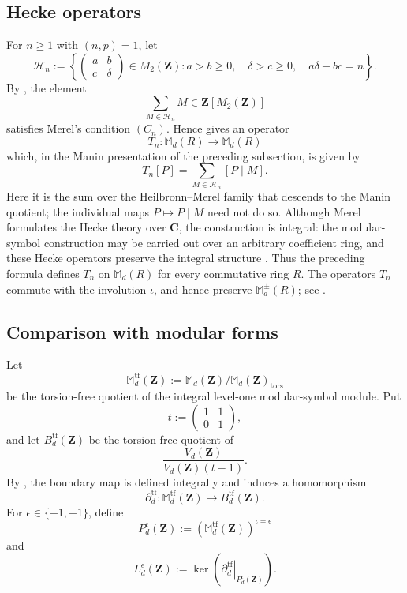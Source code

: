 \documentclass[11pt]{article}
\newcommand{\Z}{\mathbf Z}
\newcommand{\C}{\mathbf C}
\theoremstyle{plain}
\theoremstyle{definition}
\theoremstyle{remark}
\numberwithin{equation}{section}
\begin{document}
\subsection{Hecke operators} For \(n\geq1\) with \((n,p)=1\), let \[ \mathcal H_n := \left\{ \begin{pmatrix} a&b\\ c&\delta \end{pmatrix} \in M_2(\Z) : a>b\geq0,\quad \delta>c\geq0,\quad a\delta-bc=n \right\}. \] By \cite[\S3.3, Proposition~20, pp.~29--30]{Merel1994}, the element \[ \sum_{M\in\mathcal H_n}M \in\Z[M_2(\Z)] \] satisfies Merel's condition \((C_n)\). Hence \cite[\S2.1, Theorem~4, pp.~16--17]{Merel1994} gives an operator \[ T_n:\mathbb M_d(R)\longrightarrow\mathbb M_d(R) \] which, in the Manin presentation of the preceding subsection, is given by \[ T_n[P] = \sum_{M\in\mathcal H_n}[P\mid M]. \] Here it is the sum over the Heilbronn--Merel family that descends to the Manin quotient; the individual maps \(P\mapsto P\mid M\) need not do so. Although Merel formulates the Hecke theory over \(\C\), the construction is integral: the modular-symbol construction may be carried out over an arbitrary coefficient ring, and these Hecke operators preserve the integral structure \cite[\S1.1, p.~4 and \S2.1, Remark~1, p.~18]{Merel1994}. Thus the preceding formula defines \(T_n\) on \(\mathbb M_d(R)\) for every commutative ring \(R\). The operators \(T_n\) commute with the involution \(\iota\), and hence preserve \(\mathbb M_d^{\pm}(R)\); see \cite[\S2.1, Remark~2, p.~18]{Merel1994}.

\subsection{Comparison with modular forms} \label{sec:target-lattice} Let \[ \mathbb M_d^{\mathrm{tf}}(\Z) := \mathbb M_d(\Z)/\mathbb M_d(\Z)_{\mathrm{tors}} \] be the torsion-free quotient of the integral level-one modular-symbol module. Put \[ t:= \begin{pmatrix} 1&1\\ 0&1 \end{pmatrix}, \] and let \(B_d^{\mathrm{tf}}(\Z)\) be the torsion-free quotient of \[ \frac{V_d(\Z)}{V_d(\Z)(t-1)}. \] By \cite[Theorem~3.5(2)--(3)]{WieseModularSymbols}, the boundary map is defined integrally and induces a homomorphism \[ \partial_d^{\mathrm{tf}}: \mathbb M_d^{\mathrm{tf}}(\Z) \longrightarrow B_d^{\mathrm{tf}}(\Z). \] For \(\epsilon \in \{+1,-1\}\), define \[ P_d^\epsilon(\Z) := \left(\mathbb M_d^{\mathrm{tf}}(\Z)\right)^{\iota=\epsilon} \] and \[ L_d^\epsilon(\Z) := \ker\!\left( \left. \partial_d^{\mathrm{tf}} \right|_{P_d^\epsilon(\Z)} \right). \] 
\end{document}
